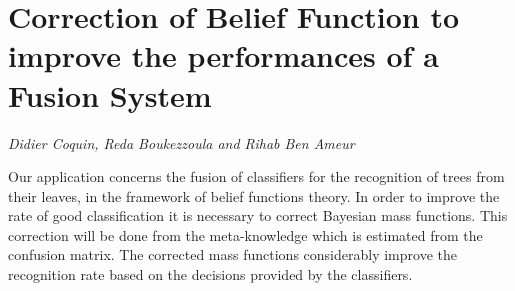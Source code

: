 \documentclass[../booklet.tex]{subfiles}
\begin{document}
\section[Correction of Belief Function to improve the performances of a Fusion System. {\it Didier Coquin, Reda Boukezzoula and Rihab Ben Ameur}]{Correction of Belief Function to improve the performances of a Fusion System}
  

\begin{center}
  {\it Didier Coquin, Reda Boukezzoula and Rihab Ben Ameur}
\end{center}

\vskip 0.8cm


Our application concerns the fusion of classifiers for the recognition of trees from their leaves, in the framework of belief functions theory. In order to improve the rate of good classification it is necessary to correct Bayesian mass functions. This correction will be done from the meta-knowledge which is estimated from the confusion matrix. The corrected mass functions considerably improve the recognition rate based on the decisions provided by the classifiers.
\end{document}
